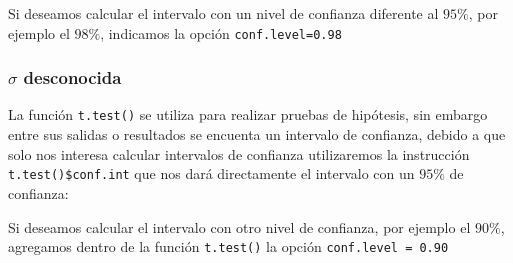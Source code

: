 \documentclass[]{book}
\newenvironment{Shaded}{\begin{snugshade}}{\end{snugshade}}
\newcommand{\CommentTok}[1]{\textcolor[rgb]{0.56,0.35,0.01}{\textit{#1}}}
\newcommand{\DataTypeTok}[1]{\textcolor[rgb]{0.13,0.29,0.53}{#1}}
\newcommand{\FloatTok}[1]{\textcolor[rgb]{0.00,0.00,0.81}{#1}}
\newcommand{\KeywordTok}[1]{\textcolor[rgb]{0.13,0.29,0.53}{\textbf{#1}}}
\newcommand{\NormalTok}[1]{#1}
\newcommand{\OperatorTok}[1]{\textcolor[rgb]{0.81,0.36,0.00}{\textbf{#1}}}
\begin{document}
\begin{Shaded}
\end{Shaded}

Si deseamos calcular el intervalo con un nivel de confianza diferente al \(95\%\), por ejemplo el \(98\%\), indicamos la opción \texttt{conf.level=0.98}

\begin{Shaded}
\end{Shaded}

\hypertarget{musd}{%
\subsubsection{\texorpdfstring{\(\sigma\) desconocida}{\textbackslash{}sigma desconocida}}\label{musd}}

La función \texttt{t.test()} se utiliza para realizar pruebas de hipótesis, sin embargo entre sus salidas o resultados se encuenta un intervalo de confianza, debido a que solo nos interesa calcular intervalos de confianza utilizaremos la instrucción \texttt{t.test()\$conf.int} que nos dará directamente el intervalo con un \(95\%\) de confianza:

\begin{Shaded}
\end{Shaded}

Si deseamos calcular el intervalo con otro nivel de confianza, por ejemplo el \(90\%\), agregamos dentro de la función \texttt{t.test()} la opción \texttt{conf.level\ =\ 0.90}
\end{document}
